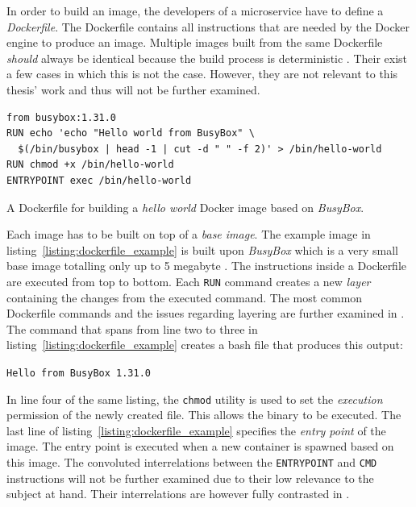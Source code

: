 In order to build an image, the developers of a microservice have to define a
\textit{Dockerfile}. The Dockerfile contains all instructions that are needed
by the Docker engine to produce an image. Multiple images built from the same
Dockerfile \textit{should} always be identical because the build process is
deterministic \autocite{DockerBestpracticeswriting}. Their exist a few cases in
which this is not the case. However, they are not relevant to this thesis' work
and thus will not be further examined.

\begin{listing}[H]
\begin{verbatim}
from busybox:1.31.0
RUN echo 'echo "Hello world from BusyBox" \
  $(/bin/busybox | head -1 | cut -d " " -f 2)' > /bin/hello-world
RUN chmod +x /bin/hello-world
ENTRYPOINT exec /bin/hello-world
\end{verbatim}
\caption{A Dockerfile for building a \textit{hello world} Docker image based on \textit{BusyBox}.}
\label{listing:dockerfile_example}
\end{listing}

Each image has to be built on top of a \textit{base image}. The example image
in listing~\ref{listing:dockerfile_example} is built upon \textit{BusyBox}
which is a very small base image totalling only up to 5 megabyte
\autocite{Communitybusybox2019}.  The instructions inside a Dockerfile are
executed from top to bottom. Each \texttt{RUN} command creates a new
\textit{layer} containing the changes from the executed command. The most
common Dockerfile commands and the issues regarding layering are further
examined in \autocite{DockerBestpracticeswriting}. The command that spans from
line two to three in listing~\ref{listing:dockerfile_example} creates a bash
file that produces this output:

\hspace{1cm} \texttt{Hello from BusyBox 1.31.0}

In line four of the same listing, the \texttt{chmod} utility is used to set the
\textit{execution} permission of the newly created file. This allows the binary
to be executed. The last line of listing~\ref{listing:dockerfile_example} specifies the
\textit{entry point} of the image. The entry point is executed when a new
container is spawned based on this image. The convoluted interrelations between
the \texttt{ENTRYPOINT} and \texttt{CMD} instructions will not be further
examined due to their low relevance to the subject at hand. Their
interrelations are however fully contrasted in
\autocite{DockerDockerfilereferenceEntrypoint}.

